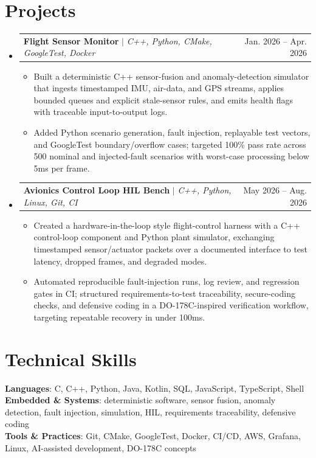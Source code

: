 \documentclass[letterpaper,11pt]{article}
\makeatletter
\newcommand{\resumeItem}[1]{
  \item\small{
    {#1 \vspace{-2pt}}
  }
}
\newcommand{\resumeProjectHeading}[2]{
    \item
    \begin{tabular*}{0.97\textwidth}{l@{\extracolsep{\fill}}r}
      \small#1 & #2 \\
    \end{tabular*}\vspace{-7pt}
}
\newcommand{\resumeSubHeadingListStart}{\begin{itemize}[leftmargin=0.15in, label={}]}
\newcommand{\resumeSubHeadingListEnd}{\end{itemize}}
\newcommand{\resumeItemListStart}{\begin{itemize}}
\newcommand{\resumeItemListEnd}{\end{itemize}\vspace{-5pt}}
\makeatother
\begin{document}
\section{Projects}
\resumeSubHeadingListStart
\resumeProjectHeading
{\textbf{Flight Sensor Monitor} $|$ \emph{C++, Python, CMake, GoogleTest, Docker}}{Jan. 2026 -- Apr. 2026}
\resumeItemListStart
\resumeItem{Built a deterministic C++ sensor-fusion and anomaly-detection simulator that ingests timestamped IMU, air-data, and GPS streams, applies bounded queues and explicit stale-sensor rules, and emits health flags with traceable input-to-output logs.}
\resumeItem{Added Python scenario generation, fault injection, replayable test vectors, and GoogleTest boundary/overflow cases; targeted 100\% pass rate across 500 nominal and injected-fault scenarios with worst-case processing below 5ms per frame.}
\resumeItemListEnd
\resumeProjectHeading
{\textbf{Avionics Control Loop HIL Bench} $|$ \emph{C++, Python, Linux, Git, CI}}{May 2026 -- Aug. 2026}
\resumeItemListStart
\resumeItem{Created a hardware-in-the-loop style flight-control harness with a C++ control-loop component and Python plant simulator, exchanging timestamped sensor/actuator packets over a documented interface to test latency, dropped frames, and degraded modes.}
\resumeItem{Automated reproducible fault-injection runs, log review, and regression gates in CI; structured requirements-to-test traceability, secure-coding checks, and defensive coding in a DO-178C-inspired verification workflow, targeting repeatable recovery in under 100ms.}
\resumeItemListEnd
\resumeSubHeadingListEnd

\section{Technical Skills}
\begin{itemize}[leftmargin=0.15in, label={}]
  \small{\item{
        \textbf{Languages}{: C, C++, Python, Java, Kotlin, SQL, JavaScript, TypeScript, Shell} \\
        \textbf{Embedded \& Systems}{: deterministic software, sensor fusion, anomaly detection, fault injection, simulation, HIL, requirements traceability, defensive coding} \\
        \textbf{Tools \& Practices}{: Git, CMake, GoogleTest, Docker, CI/CD, AWS, Grafana, Linux, AI-assisted development, DO-178C concepts}
        }}
\end{itemize}
\end{document}
